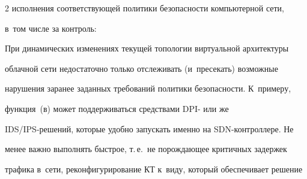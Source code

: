 \begin{multicols}{2}
исполнения соответствующей политики безопасности компьютерной сети, 


в~том числе за контроль:\\[-14pt]







  При динамических изменениях текущей топологии виртуальной архитектуры 


облачной сети недостаточно только отслеживать (и~пресекать) возможные 


нарушения заранее заданных требо\-ваний политики безопасности. К~примеру, 


функция~(в) может поддерживаться средствами DPI- или же  


IDS/IPS-ре\-ше\-ний, которые удобно запускать именно на SDN-конт\-рол\-ле\-ре. Не 


менее важно выполнять быстрое, т.\,е.\ не порождающее критичных задержек 


трафика в~сети, реконфигурирование КТ к~виду, который обеспечивает решение 



\end{multicols}
